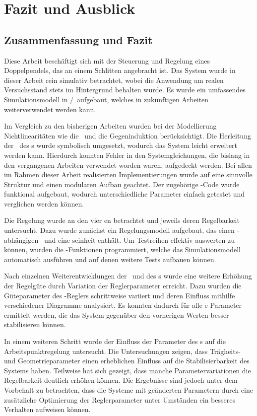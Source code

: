 \chapter{Fazit und Ausblick}

\section{Zusammenfassung und Fazit}

Diese Arbeit beschäftigt sich mit der Steuerung und Regelung eines Doppelpendels, das an einem Schlitten angebracht ist.
Das System wurde in dieser Arbeit rein simulativ betrachtet, wobei die Anwendung am realen Versuchsstand stets im Hintergrund behalten wurde.
Es wurde ein umfassendes Simulationsmodell in \ml/\sm\ aufgebaut, welches in zukünftigen Arbeiten weiterverwendet werden kann. 

Im Vergleich zu den bisherigen Arbeiten wurden bei der Modellierung Nichtlinearitäten wie die \crb\ und die Gegeninduktion berücksichtigt.
Die Herleitung der \bwgl\ des \spds s wurde symbolisch umgesetzt, wodurch das System leicht erweitert werden kann.
Hierdurch konnten Fehler in den Systemgleichungen, die bislang in den vergangenen Arbeiten verwendet worden waren, aufgedeckt werden.
Bei allen im Rahmen dieser Arbeit realisierten Implementierungen wurde auf eine sinnvolle Struktur und einen modularen Aufbau geachtet.
Der zugehörige \ml-Code wurde funktional aufgebaut, wodurch unterschiedliche Parameter einfach getestet und verglichen werden können.

Die Regelung wurde an den vier \ap en betrachtet und jeweils deren Regelbarkeit untersucht.
Dazu wurde zunächst ein Regelungsmodell aufgebaut, das einen \ap-abhängigen \zsr\ und eine \vorst seinheit enthält.
Um Testreihen effektiv auswerten zu können, wurden die \xots-Funktionen programmiert, welche das Simulationsmodell automatisch ausführen und auf denen weitere Tests aufbauen können.

Nach einzelnen Weiterentwicklungen der \vorst\ und des \beob s wurde eine weitere Erhöhung der Regelgüte durch Variation der Reglerparameter erreicht.
Dazu wurden die Güteparameter des \ricc-Reglers schrittweise variiert und deren Einfluss mithilfe verschiedener Diagramme analysiert.
Es konnten dadurch für alle \ap e Parameter ermittelt werden, die das System gegenüber den vorherigen Werten besser stabilisieren können.

In einem weiteren Schritt wurde der Einfluss der Parameter des \dpd s auf die Arbeitspunktregelung untersucht.
Die Untersuchungen zeigen, dass Trägheits- und Geometrieparameter einen erheblichen Einfluss auf die Stabilisierbarkeit des Systems haben.
Teilweise hat sich gezeigt, dass manche Parametervariationen die Regelbarkeit deutlich erhöhen können.
Die Ergebnisse sind jedoch unter dem Vorbehalt zu betrachten, dass die Systeme mit geänderten Parametern durch eine zusätzliche Optimierung der Reglerparameter unter Umständen ein besseres Verhalten aufweisen können. 

